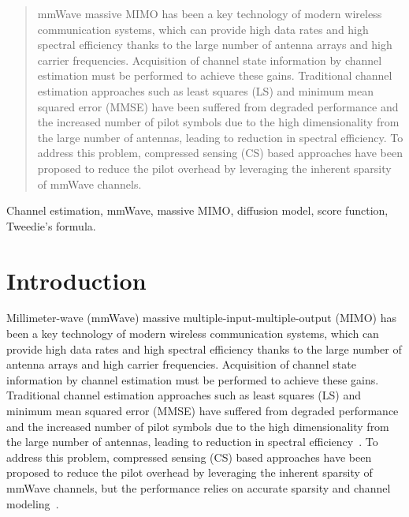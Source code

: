 \documentclass[lettersize,journal]{IEEEtran}
\begin{document}
\maketitle
\begin{abstract}
mmWave massive MIMO has been a key technology of modern wireless communication systems, which can provide high data rates and high spectral efficiency thanks to the large number of antenna arrays and high carrier frequencies. Acquisition of channel state information by channel estimation must be performed to achieve these gains. Traditional channel estimation approaches such as least squares (LS) and minimum mean squared error (MMSE) have been suffered from degraded performance and the increased number of pilot symbols due to the high dimensionality from the large number of antennas, leading to reduction in spectral efficiency. To address this problem, compressed sensing (CS) based approaches have been proposed to reduce the pilot overhead by leveraging the inherent sparsity of mmWave channels.\end{abstract}

\begin{IEEEkeywords}
Channel estimation, mmWave, massive MIMO, diffusion model, score function, Tweedie's formula.
\end{IEEEkeywords}


\section{Introduction}

Millimeter-wave (mmWave) massive multiple-input-multiple-output (MIMO) has been a key technology of modern wireless communication systems, which can provide high data rates and high spectral efficiency thanks to the large number of antenna arrays and high carrier frequencies. Acquisition of channel state information by channel estimation must be performed to achieve these gains. Traditional channel estimation approaches such as least squares (LS) and minimum mean squared error (MMSE) have suffered from degraded performance and the increased number of pilot symbols due to the high dimensionality from the large number of antennas, leading to reduction in spectral efficiency~\cite{hassibiHowMuchTraining2003}. To address this problem, compressed sensing (CS) based approaches have been proposed to reduce the pilot overhead by leveraging the inherent sparsity of mmWave channels, but the performance relies on accurate sparsity and channel modeling~\cite{zhangAtomicNormDenoisingBased2018,mendez-rialHybridMIMOArchitectures2016,choiCompressedSensingWireless2017}.
\end{document}
